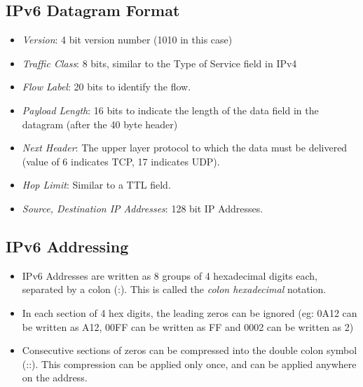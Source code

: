 \documentclass[a4paper]{article}
\theoremstyle{plain}
\theoremstyle{definition}
\begin{document}
\subsection{IPv6 Datagram Format}
\begin{itemize}
    \item \textit{Version}: 4 bit version number (1010 in this case)
    
    \item \textit{Traffic Class}: 8 bits, similar to the Type of Service field in IPv4
    
    \item \textit{Flow Label}: 20 bits to identify the flow.
    
    \item \textit{Payload Length}: 16 bits to indicate the length of the data field in the datagram (after the 40 byte header)
    
    \item \textit{Next Header}: The upper layer protocol to which the data must be delivered (value of 6 indicates TCP, 17 indicates UDP).
    
    \item \textit{Hop Limit}: Similar to a TTL field. 
    
    \item \textit{Source, Destination IP Addresses}: 128 bit IP Addresses. 
\end{itemize}

\subsection{IPv6 Addressing}
\begin{itemize}
    \item IPv6 Addresses are written as 8 groups of 4 hexadecimal digits each, separated by a colon (:). This is called the \textit{colon hexadecimal} notation.
    
    \item In each section of 4 hex digits, the leading zeros can be ignored (eg: 0A12 can be written as A12, 00FF can be written as FF and 0002 can be written as 2)
    
    \item Consecutive sections of zeros can be compressed into the double colon symbol (::). This compression can be applied only once, and can be applied anywhere on the address. 
\end{itemize}
\end{document}
